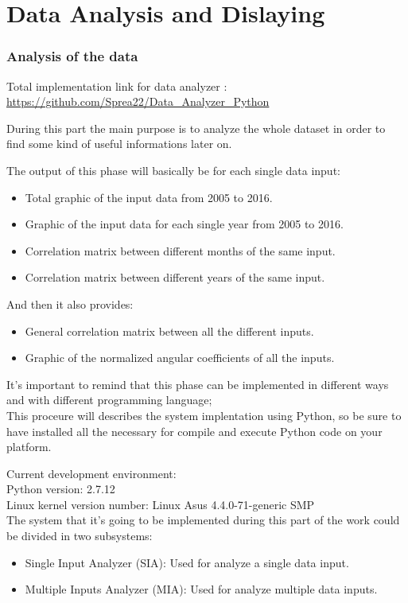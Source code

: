 \part{Data Analysis and Dislaying}
\section{Analysis of the data}
Total implementation link for data analyzer : \\
\url{https://github.com/Sprea22/Data_Analyzer_Python}

During this part the main purpose is to analyze the whole dataset in order to find some kind of useful informations later on. 

The output of this phase will basically be for each single data input:
\begin{itemize}
\item Total graphic of the input data from 2005 to 2016.
\item Graphic of the input data for each single year from 2005 to 2016.
\item Correlation matrix between different months of the same input.
\item Correlation matrix between different years of the same input.
\end{itemize}

And then it also provides:
\begin{itemize}
\item General correlation matrix between all the different inputs.
\item Graphic of the normalized angular coefficients of all the inputs.
\end{itemize}

It's important to remind that this phase can be implemented in different ways and with different programming language;\\
This proceure will describes the system implentation using Python, so be sure to have installed all the necessary for compile and execute Python code on your platform.

Current development environment:\\
Python version: 2.7.12\\
Linux kernel version number: Linux Asus 4.4.0-71-generic SMP\\

The system that it's going to be implemented during this part of the work could be divided in two subsystems:
\begin{itemize}
\item Single Input Analyzer (SIA): Used for analyze a single data input.
\item Multiple Inputs Analyzer (MIA): Used for analyze multiple data inputs.
\end{itemize}
\newpage


